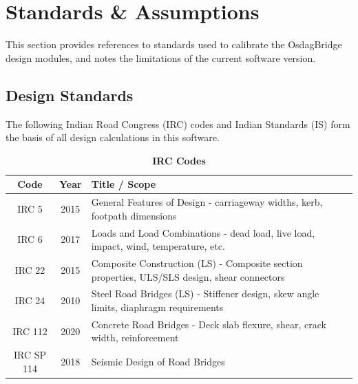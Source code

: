 \documentclass[12pt,a4paper]{report}
\numberwithin{table}{chapter}
\numberwithin{figure}{chapter}
\begin{document}
\endgroup


\chapter{Standards \& Assumptions}
\label{ch:Design Standards}

This section provides references to standards used to calibrate the OsdagBridge
design modules, and notes the limitations of the current software version.

\section{Design Standards}
\label{sec:design_standards}

The following Indian Road Congress (IRC) codes and Indian Standards (IS) 
form the basis of all design calculations in this software.

\vspace{0.5cm}

\begingroup
\setlength{\tabcolsep}{3.5pt}
\begin{table}[H]
\caption{\textbf{IRC Codes}}
\begin{tabular}{|c|c|p{13cm}|}
\hline
\textbf{Code} & \textbf{Year} & \textbf{Title / Scope} \\ 
\hline
IRC 5 & 2015 & General Features of Design - carriageway widths, kerb, footpath dimensions \\ 
\hline
IRC 6 & 2017 & Loads and Load Combinations - dead load, live load, impact, wind, temperature, etc. \\ 
\hline
IRC 22 & 2015 & Composite Construction (LS) - Composite section properties, ULS/SLS design, shear connectors \\ 
\hline
IRC 24 & 2010 & Steel Road Bridges (LS) - Stiffener design, skew angle limits, diaphragm requirements \\ 
\hline
IRC 112 & 2020 & Concrete Road Bridges - Deck slab flexure, shear, crack width, reinforcement \\ 
\hline
IRC SP 114 & 2018 & Seismic Design of Road Bridges \\ 
\hline
\end{tabular}
\end{table}
\end{document}

